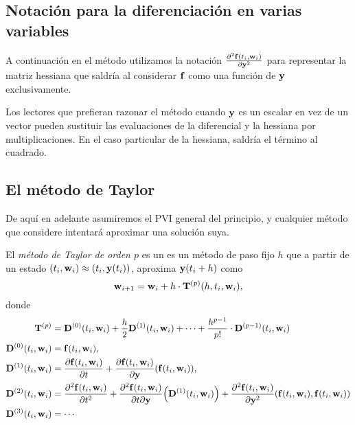 \subsection{Notación para la diferenciación en varias variables}

A continuación en el método utilizamos la notación
$\pdv[2]{\vb{f}{}(t_i, \vb{w}{}_i)}{\vb{y}{}}$
para representar la matriz hessiana que saldría al considerar $\vb{f}{}$
como una función de $\vb{y}{}$ exclusivamente.

Los lectores que prefieran razonar el método
cuando $\vb{y}{}$ es un escalar en vez de un vector
pueden sustituir las evaluaciones de la diferencial y la hessiana
por multiplicaciones.
En el caso particular de la hessiana, saldría el término al cuadrado.

\subsection{El método de Taylor}
 
De aquí en adelante asumiremos el PVI general del principio,
y cualquier método que considere intentará aproximar una solución suya.

\begin{method}\label{met:taylor}
    \newcommand{\D}{\vb{D}}

    El \emph{método de Taylor de orden $p$} es un es un método de paso fijo $h$
    que a partir de un estado $(t_i, \vb{w}{}_i) \approx (t_i, \vb{y}{}(t_i))$,
    aproxima $\vb{y}{}(t_i + h)$ como
    \begin{equation*}
        \vb{w}{}_{i+1} =
        \vb{w}{}_i + h\cdot \vb{T}^{(p)}(h, t_i, \vb{w}{}_i),
    \end{equation*}
    donde
    \begin{align*}
        \vb{T}^{(p)} &=
            \D^{(0)}(t_i, \vw_i)
            + \frac{h}{2}\D^{(1)}(t_i, \vw_i)
            + \cdots
            + \frac{h^{p-1}}{p!}\cdot \D^{(p-1)}(t_i, \vw_i) \\
        \D^{(0)}(t_i, \vw_i) &= \vf(t_i, \vw_i), \\
        \D^{(1)}(t_i, \vw_i) &=
            \pdv{\vf(t_i, \vw_i)}{t} +
            \pdv{\vf(t_i, \vw_i)}{\vy}\qty(\vf(t_i, \vw_i)), \\
        \D^{(2)}(t_i, \vw_i) &=
            \pdv[2]{\vf(t_i, \vw_i)}{t} +
            \pdv{\vf(t_i, \vw_i)}{t}{\vy}\qty(\D^{(1)}(t_i, \vw_i)) +
            \pdv[2]{\vf(t_i, \vw_i)}{\vy}\qty(
                \vf(t_i, \vw_i), \vf(t_i, \vw_i)
            ) \\
        \D^{(3)}(t_i, \vw_i) &= \cdots
    \end{align*}
\end{method}

